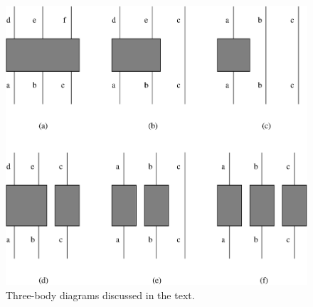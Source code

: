 \documentclass[prc,aps,amsmath,amssymb,preprintnumbers,showpacs,twocolumn]{revtex4}
\begin{document}
%
\begin{figure}[t]    
 \includegraphics[width=7.5truecm]{fig2.eps}
\caption{Three-body diagrams discussed in the text.} \label{f2}
\end{figure}
%
\end{document}
